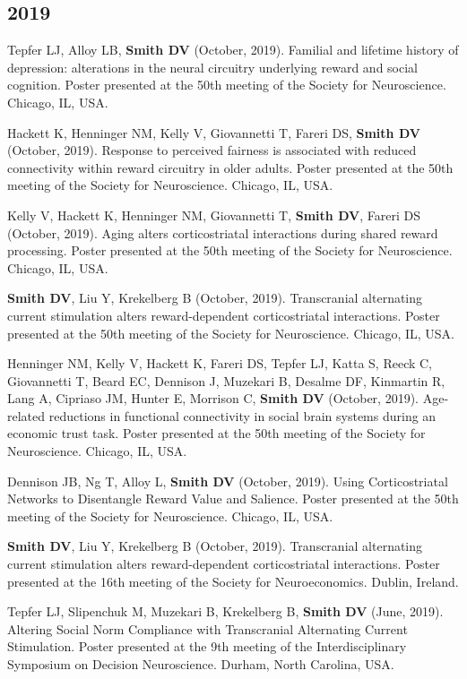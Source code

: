 \documentclass[11pt, letterpaper]{article}
\begin{document}
\subsection*{2019}
\begin{hangparas}{.5in}{1}

Tepfer LJ, Alloy LB, \textbf{Smith DV} (October, 2019). Familial and lifetime history of depression: alterations in the neural circuitry underlying reward and social cognition. Poster presented at the 50th meeting of the Society for Neuroscience. Chicago, IL, USA.

Hackett K, Henninger NM, Kelly V, Giovannetti T, Fareri DS, \textbf{Smith DV} (October, 2019). Response to perceived fairness is associated with reduced connectivity within reward circuitry in older adults. Poster presented at the 50th meeting of the Society for Neuroscience. Chicago, IL, USA.

Kelly V, Hackett K, Henninger NM, Giovannetti T, \textbf{Smith DV}, Fareri DS (October, 2019). Aging alters corticostriatal interactions during shared reward processing. Poster presented at the 50th meeting of the Society for Neuroscience. Chicago, IL, USA.

\textbf{Smith DV}, Liu Y, Krekelberg B (October, 2019). Transcranial alternating current stimulation alters reward-dependent corticostriatal interactions. Poster presented at the 50th meeting of the Society for Neuroscience. Chicago, IL, USA. 

Henninger NM, Kelly V, Hackett K, Fareri DS, Tepfer LJ, Katta S, Reeck C, Giovannetti T, Beard EC, Dennison J, Muzekari B, Desalme DF, Kinmartin R, Lang A, Cipriaso JM, Hunter E, Morrison C, \textbf{Smith DV} (October, 2019). Age‐related reductions in functional connectivity in social brain systems during an economic trust task. Poster presented at the 50th meeting of the Society for Neuroscience. Chicago, IL, USA.

Dennison JB, Ng T, Alloy L, \textbf{Smith DV} (October, 2019). Using Corticostriatal Networks to Disentangle Reward Value and Salience. Poster presented at the 50th meeting of the Society for Neuroscience. Chicago, IL, USA.

\textbf{Smith DV}, Liu Y, Krekelberg B (October, 2019). Transcranial alternating current stimulation alters reward-dependent corticostriatal interactions. Poster presented at the 16th meeting of the Society for Neuroeconomics. Dublin, Ireland. 

Tepfer LJ, Slipenchuk M, Muzekari B, Krekelberg B, \textbf{Smith DV} (June, 2019). Altering Social Norm Compliance with Transcranial Alternating Current Stimulation. Poster presented at the 9th meeting of the Interdisciplinary Symposium on Decision Neuroscience. Durham, North Carolina, USA.


\end{hangparas}
\end{document}
